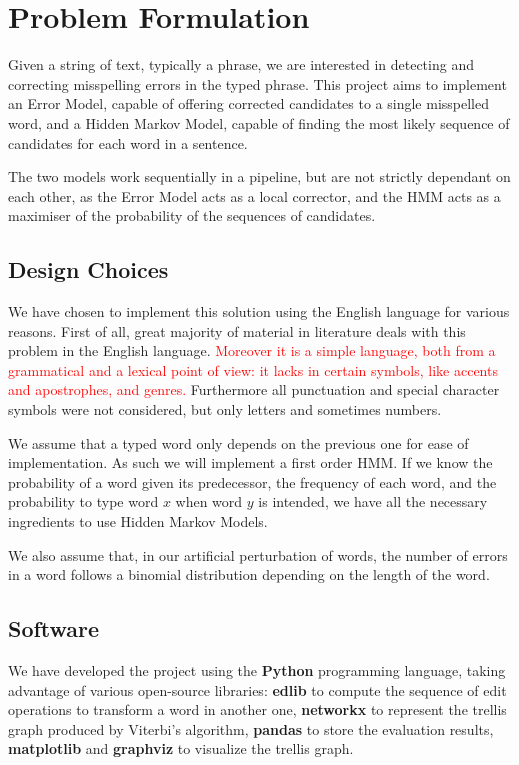 \chapter{Problem Formulation}

Given a string of text, typically a phrase, we are interested in detecting and correcting misspelling errors in the 
typed phrase. This project aims to implement an Error Model, capable of offering corrected candidates to a single 
misspelled word, and a Hidden Markov Model, capable of finding the most likely sequence of candidates for each word in 
a sentence.

The two models work sequentially in a pipeline, but are not strictly dependant on each other, as the Error Model 
acts as a local corrector, and the HMM acts as a maximiser of the probability of the sequences of candidates.

\section{Design Choices}

We have chosen to implement this solution using the English language for various reasons. First of all, great 
majority of material in literature deals with this problem in the English language. \textcolor{red}{Moreover it is a 
simple language, both from a grammatical and a lexical point of view: it lacks in certain symbols, like accents 
and apostrophes, and genres. }
Furthermore all punctuation and special character symbols were not considered, but only letters and sometimes 
numbers. 

We assume that a typed word only depends on the previous one for ease of implementation. As such we will implement a first order HMM. 
If we know the probability of a word given its predecessor, the frequency of each word, and the probability to 
type word $x$ when word $y$ is intended, we have all the necessary ingredients to use Hidden Markov Models.

We also assume that, in our artificial perturbation of words, the number of errors in a word follows a binomial 
distribution depending on the length of the word.

\section{Software}
We have developed the project using the \textbf{Python} programming language, taking advantage of various open-source 
libraries: \textbf{edlib} to compute the sequence of edit operations to transform a word in another one,  
\textbf{networkx} to represent the trellis graph produced by Viterbi's algorithm, \textbf{pandas} to store the 
evaluation results, \textbf{matplotlib} and \textbf{graphviz} to visualize the trellis graph.


